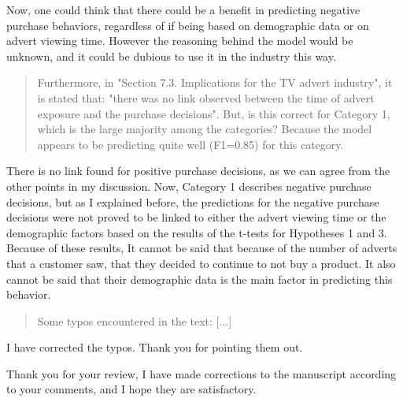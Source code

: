 \documentclass[review]{elsarticle}
\begin{document}
Now, one could think that there could be a benefit in predicting negative purchase behaviors, regardless of if being based on demographic data or on advert viewing time. However the reasoning behind the model would be unknown, and it could be dubious to use it in the industry this way.


\begin{quotation}
Furthermore, in "Section 7.3. Implications for the TV advert industry", it is stated that: "there was no link observed between the time of advert exposure and the purchase decisions". But, is this correct for Category 1, which is the large majority among the categories? Because the model appears to be predicting quite well (F1=0.85) for this category.
\end{quotation}

There is no link found for positive purchase decisions, as we can agree from the other points in my discussion. Now, Category 1 describes negative purchase decisions, but as I explained before, the predictions for the negative purchase decisions were not proved to be linked to either the advert viewing time or the demographic factors based on the results of the t-tests for Hypotheses 1 and 3. Because of these results, It cannot be said that because of the number of adverts that a customer saw, that they decided to continue to not buy a product. It also cannot be said that their demographic data is the main factor in predicting this behavior. 


\begin{quotation}
Some typos encountered in the text: [...]
\end{quotation}

I have corrected the typos. Thank you for pointing them out.


Thank you for your review, I have made corrections to the manuscript according to your comments, and I hope they are satisfactory.
\end{document}
